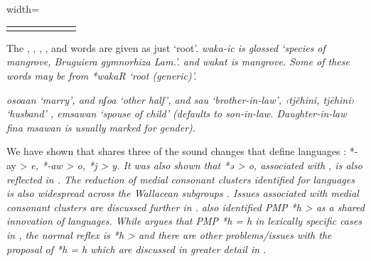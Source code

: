 \begin{table}
\begin{adjustbox}{width=\textwidth}
\begin{threeparttable}
\begin{tabular}{lllllll}
		\lspbottomrule
	\end{tabular}
		\begin{tablenotes}\tnsize
			\item[†]	{The ,
								, , , and  words are given as just ‘root’.
								 \it{waka-ic} is glossed ‘species of mangrove, \it{Bruguiera gymnorhiza Lam.}’.
								 and  \it{wakat} is mangrove.
								Some of these words may be from *wakaR ‘root (generic)’.}
			\item[‡]	{ \it{osoaan} ‘marry’,
								 and  \it{nʃoa} ‘other half’,
								 and  \it{sau} ‘brother-in-law’,
								 ‹tjěhini, tjēhini› ‘husband’ \citep[6]{Stokhof1980b},
								 \it{emsawan} ‘spouse of child' (defaults to son-in-law.
								Daughter-in-law \it{fina msawan} is usually marked for gender).}
		\end{tablenotes}
	\end{threeparttable}
\end{adjustbox}
\end{table}

We have shown that  shares three of the sound changes
that define  languages \citep{Mead2003a}: *-ay >
\it{e}, *-aw > \it{o}, *j > \it{y}.
It was also shown that *ə > \it{o,} associated with , is also reflected in .
The reduction of medial consonant clusters identified for 
languages \citep{Mead2003a} is also widespread across the
Wallacean subgroups \citep{Blust1993}.
Issues associated with medial consonant clusters
are discussed further in .
\citet{Mead2003a} also identified PMP *h > {\0}
as a shared innovation of  languages.
While \citet{Blust1981} argues that PMP *h = \it{h} in lexically
specific cases in ,
the normal reflex is *h > {\0}
and there are other problems/issues with the proposal of *h =
\it{h} which are discussed in greater detail in .

